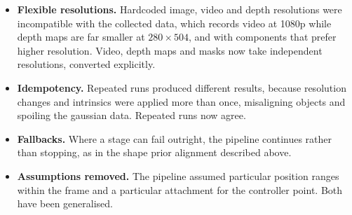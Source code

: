 \begin{itemize}
	\item \textbf{Flexible resolutions.} Hardcoded image, video and depth resolutions were
	      incompatible with the collected data, which records video at 1080p while depth maps are far
	      smaller at $280 \times 504$, and with components that prefer higher resolution. Video, depth
	      maps and masks now take independent resolutions, converted explicitly.
	\item \textbf{Idempotency.} Repeated runs produced different results, because resolution changes
	      and intrinsics were applied more than once, misaligning objects and spoiling the gaussian
	      data. Repeated runs now agree.
	\item \textbf{Fallbacks.} Where a stage can fail outright, the pipeline continues rather than
	      stopping, as in the shape prior alignment described above.
	\item \textbf{Assumptions removed.} The pipeline assumed particular position ranges within the
	      frame and a particular attachment for the controller point. Both have been generalised.
\end{itemize}
